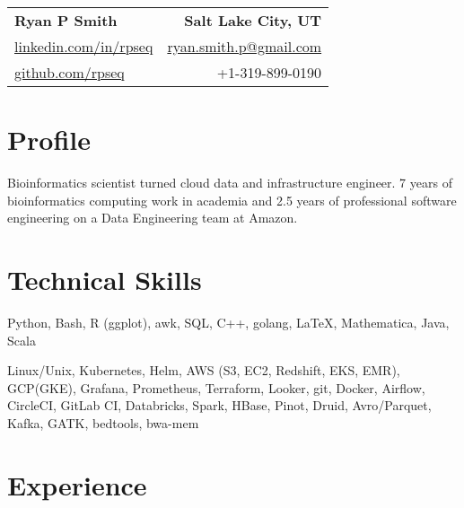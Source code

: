 
\RequirePackage{preamble}



\begin{tabular*}{\textwidth}{l@{\extracolsep{\fill}}r}
	\textbf{{\Large Ryan P Smith}} & \textbf{Salt Lake City, UT} \\
	\href{http://www.linkedin.com/in/rpseq}{linkedin.com/in/rpseq} &
	\href{mailto:ryan.smith.p@gmail.com}{ryan.smith.p@gmail.com} \\
	\href{https://github.com/RPSeq}{github.com/rpseq} & +1-319-899-0190 \\
\end{tabular*}

\section{Profile}

\small{Bioinformatics scientist turned cloud data and infrastructure engineer. 7 years of bioinformatics computing work in academia and 2.5 years of professional software engineering on a Data Engineering team at Amazon.}


\section{Technical Skills}
\resumeSubHeadingListStart

{Python, Bash, R (ggplot), awk, SQL, C++, golang, \LaTeX, Mathematica, Java, Scala}

{Linux/Unix, Kubernetes, Helm, AWS (S3, EC2, Redshift, EKS, EMR), GCP(GKE), Grafana, Prometheus, Terraform, Looker, git, Docker, Airflow, CircleCI, GitLab CI, Databricks, Spark, HBase, Pinot, Druid, Avro/Parquet, Kafka, GATK, bedtools, bwa-mem}

\resumeSubHeadingListEnd

\section{Experience}
\resumeSubHeadingListStart

